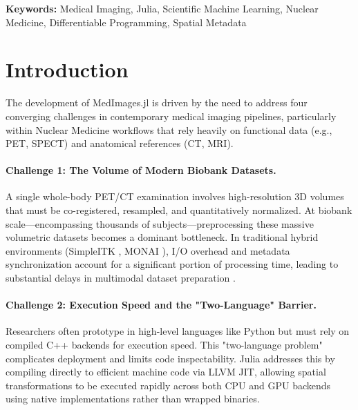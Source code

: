 \documentclass[10pt,letterpaper]{article}
\begin{document}
\textbf{Keywords:} Medical Imaging, Julia, Scientific Machine Learning, Nuclear Medicine, Differentiable Programming, Spatial Metadata

\section{Introduction}

The development of MedImages.jl is driven by the need to address four converging challenges in contemporary medical imaging pipelines, particularly within Nuclear Medicine workflows that rely heavily on functional data (e.g., PET, SPECT) and anatomical references (CT, MRI).

\paragraph{Challenge 1: The Volume of Modern Biobank Datasets.}
A single whole-body PET/CT examination involves high-resolution 3D volumes that must be co-registered, resampled, and quantitatively normalized. At biobank scale---encompassing thousands of subjects---preprocessing these massive volumetric datasets becomes a dominant bottleneck. In traditional hybrid environments (SimpleITK \cite{LowekampChen2013}, MONAI \cite{CardosoLi2022}), I/O overhead and metadata synchronization account for a significant portion of processing time, leading to substantial delays in multimodal dataset preparation \cite{Dexl_2025}.

\paragraph{Challenge 2: Execution Speed and the "Two-Language" Barrier.}
Researchers often prototype in high-level languages like Python but must rely on compiled C++ backends for execution speed. This "two-language problem" complicates deployment and limits code inspectability. Julia \cite{BezansonChen2018} addresses this by compiling directly to efficient machine code via LLVM JIT, allowing spatial transformations to be executed rapidly across both CPU and GPU backends using native implementations rather than wrapped binaries.
\end{document}
